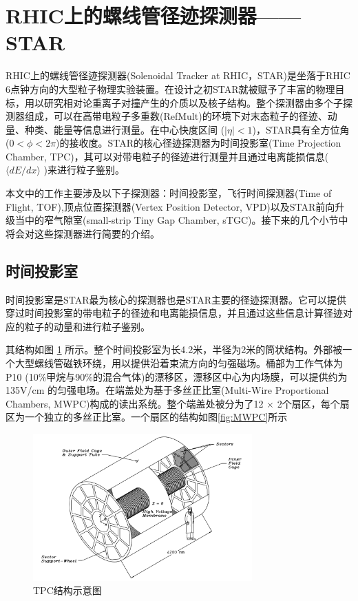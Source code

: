 \section{RHIC上的螺线管径迹探测器——STAR}
RHIC上的螺线管径迹探测器(Solenoidal Tracker at RHIC，STAR)是坐落于RHIC 6点钟方向的大型粒子物理实验装置。在设计之初STAR就被赋予了丰富的物理目标，用以研究相对论重离子对撞产生的介质以及核子结构。整个探测器由多个子探测器组成，可以在高带电粒子多重数(RefMult)的环境下对末态粒子的径迹、动量、种类、能量等信息进行测量。在中心快度区间 ($|\eta| < 1 $)，STAR具有全方位角 ($ 0 < \phi < 2\pi$)的接收度。STAR的核心径迹探测器为时间投影室(Time Projection Chamber, TPC)，其可以对带电粒子的径迹进行测量并且通过电离能损信息($ \langle dE/dx \rangle $ )来进行粒子鉴别。

本文中的工作主要涉及以下子探测器：时间投影室，飞行时间探测器(Time of Flight, TOF),顶点位置探测器(Vertex Position Detector, VPD)以及STAR前向升级当中的窄气隙室(small-strip Tiny Gap Chamber, sTGC)。接下来的几个小节中将会对这些探测器进行简要的介绍。

\subsection{时间投影室}
\label{chap:TPC}
时间投影室是STAR最为核心的探测器也是STAR主要的径迹探测器。它可以提供穿过时间投影室的带电粒子的径迹和电离能损信息，并且通过这些信息计算径迹对应的粒子的动量和进行粒子鉴别。

其结构如图 \ref{fig:TPC} 所示。整个时间投影室为长4.2米，半径为2米的筒状结构。外部被一个大型螺线管磁铁环绕，用以提供沿着束流方向的匀强磁场。桶部为工作气体为P10 (10\%甲烷与90\%的混合气体)的漂移区，漂移区中心为内场膜，可以提供约为 135V/cm 的匀强电场。在端盖处为基于多丝正比室(Multi-Wire Proportional Chambers, MWPC)构成的读出系统。整个端盖处被分为了12 $\times$ 2个扇区，每个扇区为一个独立的多丝正比室。一个扇区的结构如图\ref{fig:MWPC}所示
\begin{figure}[htb]
    \begin{center}
    \includegraphics[width=0.75\textwidth,clip]{figures/Chapter2/TPC.png}
    \end{center}
    \caption[TPC结构示意图]{TPC结构示意图}
    \label{fig:TPC}
\end{figure}

